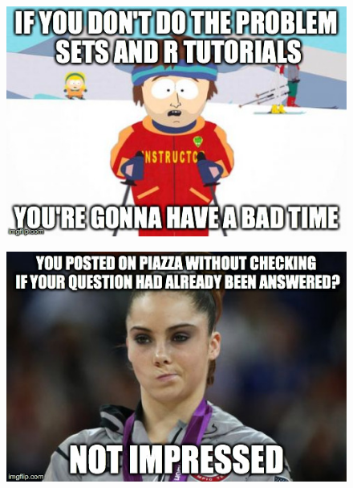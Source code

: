 \documentclass[handout]{beamer}
\begin{document}
\begin{frame}

\begin{figure}
\includegraphics[scale=0.5]{./images/HomeworkMeme.jpg}
\end{figure}


\end{frame}
\begin{frame}

\begin{figure}
\includegraphics[scale=0.5]{./images/PiazzaMeme.jpg}
\end{figure}


\end{frame}
\end{document}
